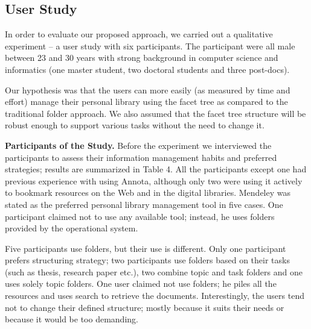 \documentclass[12pt]{article}
\begin{document}
 
 \subsection{User Study}
 In order to evaluate our proposed approach, we carried out a qualitative experiment – a user study with six participants. The participant were all male between 23 and 30 years with strong background in computer science and informatics (one master student, two doctoral students and three post-docs). 
 
 Our hypothesis was that the users can more easily (as measured by time and effort) manage their personal library using the facet tree as compared to the traditional folder approach. We also assumed that the facet tree structure will be robust enough to support various tasks without the need to change it.    
 
 
 \textbf{Participants of the Study.} Before the experiment we interviewed the participants to assess their information management habits and preferred strategies; results are summarized in Table 4. All the participants except one had previous experience with using Annota, although only two were using it actively to bookmark resources on the Web and in the digital libraries. Mendeley was stated as the preferred personal library management tool in five cases. One participant claimed not to use any available tool; instead, he uses folders provided by the operational system. 
 
 Five participants use folders, but their use is different. Only one participant prefers structuring strategy; two participants use folders based on their tasks (such as thesis, research paper etc.), two combine topic and task folders and one uses solely topic folders. One user claimed not use folders; he piles all the resources and uses search to retrieve the documents. Interestingly, the users tend not to change their defined structure; mostly because it suits their needs or because it would be too demanding.
 
\end{document}
